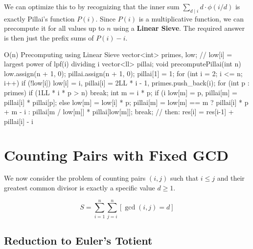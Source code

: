 \documentclass[11pt]{article}
\newcommand{\complexity}[1]{%
  \tcbox[on line, 
    colback=complbg, 
    colframe=compltext!50, 
    boxrule=0.5pt, 
    arc=2pt, 
    boxsep=0pt, 
    left=3pt, right=3pt, top=2pt, bottom=2pt
  ]{\color{compltext}\small\ensuremath{#1}}%
}
\begin{document}
We can optimize this to \complexity{O(n)} by recognizing that the inner sum $\sum_{d \mid i} d \cdot \phi(i/d)$ is exactly Pillai's function $P(i)$. Since $P(i)$ is a multiplicative function, we can precompute it for all values up to $n$ using a \textbf{Linear Sieve}.
The required answer is then just the prefix sums of $P(i) - i$.

\begin{vscode}{O(n) Precomputing using Linear Sieve}
vector<int> primes, low; // low[i] = largest power of lpf(i) dividing i
vector<ll> pillai;
void precomputePillai(int n) 
{
    low.assign(n + 1, 0); pillai.assign(n + 1, 0); pillai[1] = 1;
    for (int i = 2; i <= n; i++) 
    {
        if (!low[i]) low[i] = i, pillai[i] = 2LL * i - 1, primes.push_back(i);
        for (int p : primes) 
        {
            if (1LL * i * p > n) break;
            int m = i * p;
            if (i %
                low[m] = p, pillai[m] = pillai[i] * pillai[p];
            else 
            {
                low[m] = low[i] * p;
                pillai[m] = low[m] == m ? pillai[i] * p + m - i
                                        : pillai[m / low[m]] * pillai[low[m]];
                break;
            }
        }
    }
}
// then: res[i] = res[i-1] + pillai[i] - i
\end{vscode}

\pagebreak
\section{Counting Pairs with Fixed GCD}
\label{sec:fixed_gcd_pairs}

We now consider the problem of counting pairs $(i, j)$ such that $i \le j$ and their greatest common divisor is exactly a specific value $d \ge 1$.

\[ S = \sum_{i=1}^n \sum_{j=i}^n [\gcd(i, j) = d] \]

\subsection{Reduction to Euler's Totient}
\end{document}
